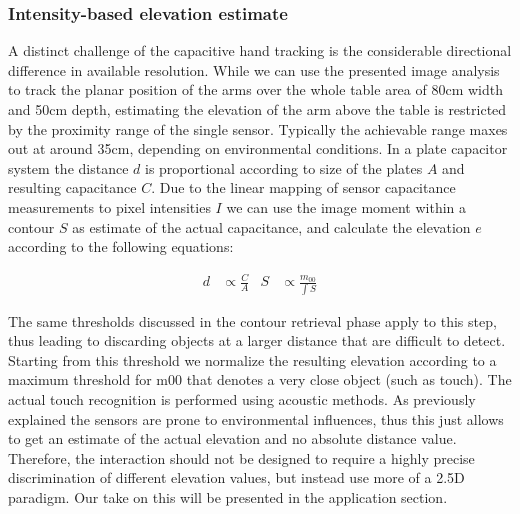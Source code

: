 \subsubsection{Intensity-based elevation estimate}
A distinct challenge of the capacitive hand tracking is the considerable directional difference in available resolution. While we can use the presented image analysis to track the planar position of the arms over the whole table area of 80cm width and 50cm depth, estimating the elevation of the arm above the table is restricted by the proximity range of the single sensor. Typically the achievable range maxes out at around 35cm, depending on environmental conditions. In a plate capacitor system the distance $d$ is proportional according to size of the plates $A$ and resulting capacitance $C$. Due to the linear mapping of sensor capacitance measurements to pixel intensities $I$ we can use the image moment within a contour $S$ as estimate of the actual capacitance, and calculate the elevation $e$ according to the following equations:

\begin{align}
d&\propto{\tfrac{C}{A}} & S&\propto{\tfrac{m_{00}}{\int{S}}}
\end{align}

The same thresholds discussed in the contour retrieval phase apply to this step, thus leading to discarding objects at a larger distance that are difficult to detect. Starting from this threshold we normalize the resulting elevation according to a maximum threshold for m00 that denotes a very close object (such as touch). The actual touch recognition is performed using acoustic methods. 
As previously explained the sensors are prone to environmental influences, thus this just allows to get an estimate of the actual elevation and no absolute distance value. Therefore, the interaction should not be designed to require a highly precise discrimination of different elevation values, but instead use more of a 2.5D paradigm. Our take on this will be presented in the application section.


